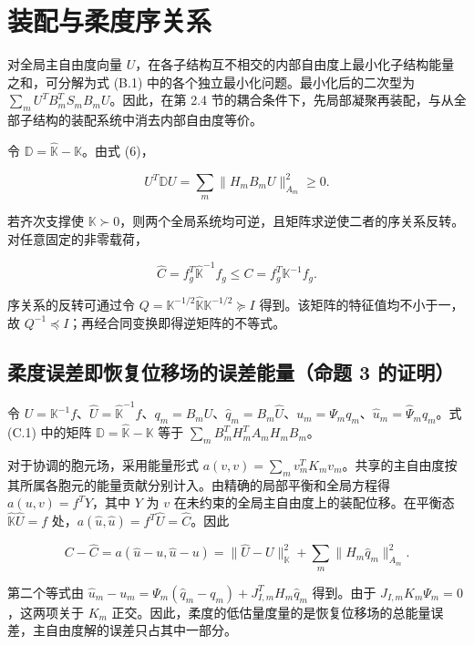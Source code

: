 \documentclass[preprint,12pt,authoryear]{elsarticle}
\begin{document}
\section{装配与柔度序关系}

对全局主自由度向量 \(U\)，在各子结构互不相交的内部自由度上最小化子结构能量之和，可分解为式 (B.1) 中的各个独立最小化问题。最小化后的二次型为 \(\sum_m U^TB_m^TS_mB_mU\)。因此，在第 2.4 节的耦合条件下，先局部凝聚再装配，与从全部子结构的装配系统中消去内部自由度等价。

令 \(\mathbb D=\widehat{\mathbb K}-\mathbb K\)。由式 (6)，

\[
U^T\mathbb D U=\sum_m\|H_m B_mU\|_{A_m}^2\ge0.
\tag{C.1}
\]

若齐次支撑使 \(\mathbb K\succ0\)，则两个全局系统均可逆，且矩阵求逆使二者的序关系反转。对任意固定的非零载荷，

\[
\widehat C=f_g^T\widehat{\mathbb K}^{-1}f_g
\le C=f_g^T\mathbb K^{-1}f_g.
\tag{C.2}
\]

序关系的反转可通过令 \(Q=\mathbb K^{-1/2}\widehat{\mathbb K}\mathbb K^{-1/2}\succeq I\) 得到。该矩阵的特征值均不小于一，故 \(Q^{-1}\preceq I\)；再经合同变换即得逆矩阵的不等式。

\subsection{柔度误差即恢复位移场的误差能量（命题 3 的证明）}

令 \(U=\mathbb K^{-1}f\)、\(\widehat U=\widehat{\mathbb K}^{-1}f\)、\(q_m=B_mU\)、\(\widehat q_m=B_m\widehat U\)、\(u_m=\Psi_mq_m\)、\(\widehat u_m=\widehat\Psi_m\widehat q_m\)。式 (C.1) 中的矩阵 \(\mathbb D=\widehat{\mathbb K}-\mathbb K\) 等于 \(\sum_m B_m^TH_m^TA_mH_mB_m\)。

对于协调的胞元场，采用能量形式 \(a(v,v)=\sum_m v_m^TK_mv_m\)。共享的主自由度按其所属各胞元的能量贡献分别计入。由精确的局部平衡和全局方程得 \(a(u,v)=f^TY\)，其中 \(Y\) 为 \(v\) 在未约束的全局主自由度上的装配位移。在平衡态 \(\widehat{\mathbb K}\widehat U=f\) 处，\(a(\widehat u,\widehat u)=f^T\widehat U=\widehat C\)。因此

\[
\boxed{C-\widehat C=a(\widehat u-u,\widehat u-u)
=\|\widehat U-U\|_{\mathbb K}^2
+\sum_m\|H_m\widehat q_m\|_{A_m}^2.}
\]

第二个等式由
\(\widehat u_m-u_m=\Psi_m(\widehat q_m-q_m)+J_{I,m}^TH_m\widehat q_m\)
得到。由于 \(J_{I,m}K_m\Psi_m=0\)，这两项关于 \(K_m\) 正交。因此，柔度的低估量度量的是恢复位移场的总能量误差，主自由度解的误差只占其中一部分。
\end{document}
